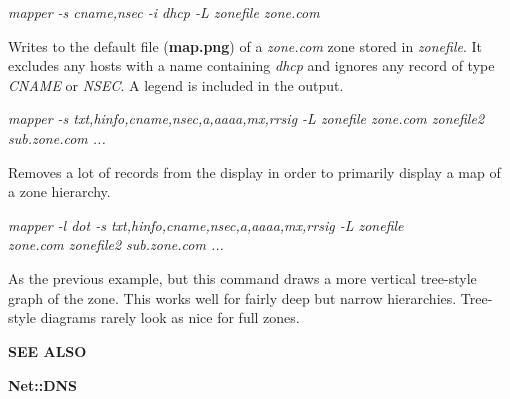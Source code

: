 \begin{description}

\item {\it mapper -s cname,nsec -i dhcp -L zonefile zone.com}\verb" "

Writes to the default file ({\bf map.png}) of a {\it zone.com} zone
stored in {\it zonefile}.  It excludes any hosts with a name containing
{\it dhcp} and ignores any record of type {\it CNAME} or {\it NSEC}.
A legend is included in the output.

\item {\it mapper -s txt,hinfo,cname,nsec,a,aaaa,mx,rrsig -L zonefile zone.com zonefile2 sub.zone.com ...}\verb" "

Removes a lot of records from the display in order to primarily
display a map of a zone hierarchy.

\item {\it mapper -l dot -s txt,hinfo,cname,nsec,a,aaaa,mx,rrsig -L zonefile \\ zone.com zonefile2 sub.zone.com ...}\verb" "

As the previous example, but this command draws a more vertical tree-style
graph of the zone.  This works well for fairly deep but narrow hierarchies.
Tree-style diagrams rarely look as nice for full zones.

\end{description}

{\bf SEE ALSO}

{\bf Net::DNS}
